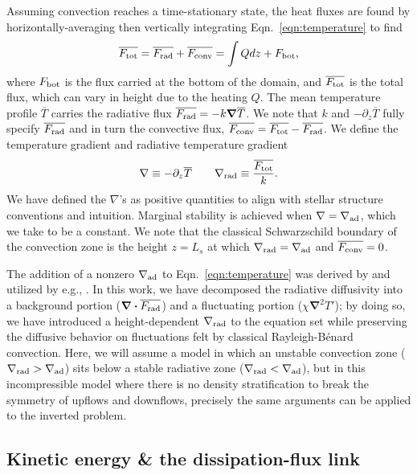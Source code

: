 \documentclass[twocolumn]{aastex631}
\newcommand{\gradrad}{\ensuremath{\nabla_{\rm{rad}}}}
\newcommand{\gradad}{\ensuremath{\nabla_{\rm{ad}}}}
\newcommand{\justgrad}{\ensuremath{\nabla}}
\newcommand{\Fbot}{\ensuremath{F_{\rm{bot}}}}
\newcommand{\Ftot}{\ensuremath{F_{\rm{tot}}}}
\newcommand{\Frad}{\ensuremath{F_{\rm{rad}}}}
\newcommand{\Fconv}{\ensuremath{F_{\rm{conv}}}}
\renewcommand{\vec}[1]{\boldsymbol{#1}}
\renewcommand{\dot}{\vec{\cdot}}
\renewcommand{\bar}[1]{\overline{#1}}
\newcommand{\grad}{\vec{\nabla}}
\begin{document}
Assuming convection reaches a time-stationary state, the heat fluxes are found by horizontally-averaging then vertically integrating Eqn.~\ref{eqn:temperature} to find
\begin{equation}
\overline{\Ftot} = \overline{\Frad} + \overline{\Fconv} = \int Q dz + \Fbot,
\label{eqn:flux_definition}
\end{equation}
where $\Fbot$ is the flux carried at the bottom of the domain, and $\overline{\Ftot}$ is the total flux, which can vary in height due to the heating $Q$.
The mean temperature profile $\overline{T}$ carries the radiative flux $\bar{\Frad} = -k \grad \overline{T}$.
We note that $k$ and $-\partial_z \bar{T}$ fully specify $\bar{\Frad}$ and in turn the convective flux, $\bar{\Fconv} = \bar{\Ftot} - \bar{\Frad}$.
We define the temperature gradient and radiative temperature gradient 
\begin{equation}
\justgrad \equiv -\partial_z \bar{T} \qquad
\gradrad \equiv \frac{\bar{\Ftot}}{k}.
\label{eqn:gradrad_definition}
\end{equation}
We have defined the $\justgrad$'s as positive quantities to align with stellar structure conventions and intuition.
Marginal stability is achieved when $\justgrad = \gradad$, which we take to be a constant.
We note that the classical Schwarzschild boundary of the convection zone is the height $z = L_s$ at which $\gradrad = \gradad$ and $\bar{\Fconv} = 0$.

The addition of a nonzero $\gradad$ to Eqn.~\ref{eqn:temperature} was derived by \citet{spiegel_veronis_1960} and utilized by e.g., \citet{korre_etal_2019}.
In this work, we have decomposed the radiative diffusivity into a background portion ($\grad\dot \bar{\Frad}$) and a fluctuating portion ($\chi \grad^2 T'$); by doing so, we have introduced a height-dependent $\gradrad$ to the equation set while preserving the diffusive behavior on fluctuations felt by classical Rayleigh-B\'{e}nard convection.
Here, we will assume a model in which an unstable convection zone ($\gradrad > \gradad$) sits below a stable radiative zone ($\gradrad < \gradad$), but in this incompressible model where there is no density stratification to break the symmetry of upflows and downflows, precisely the same arguments can be applied to the inverted problem.

\subsection{Kinetic energy \& the dissipation-flux link}
\label{sec:theory_energy}
\end{document}
